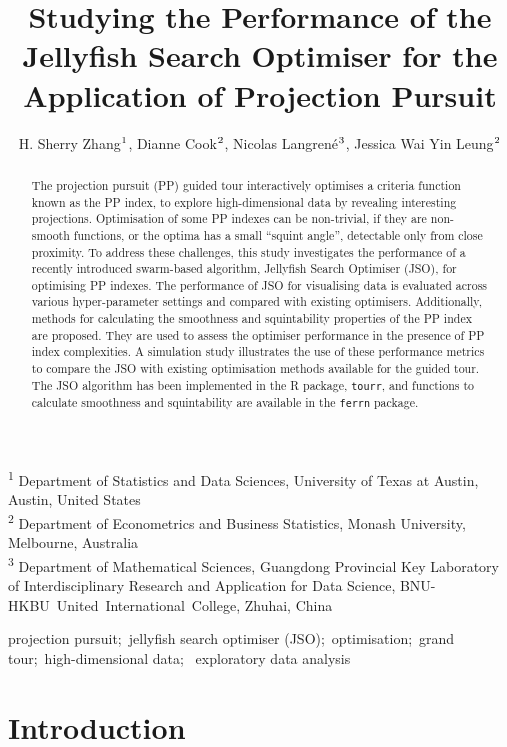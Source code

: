 \documentclass[
  12pt,
]{interact}
\title{Studying the Performance of the Jellyfish Search Optimiser for
the Application of Projection Pursuit}
\author{H. Sherry Zhang$\textsuperscript{1}$, Dianne
Cook$\textsuperscript{2}$, Nicolas
Langrené$\textsuperscript{3}$, Jessica Wai Yin
Leung$\textsuperscript{2}$}
\theoremstyle{plain}
\begin{document}
\captionsetup{labelsep=space}
\maketitle
\textsuperscript{1} Department of Statistics and Data
Sciences, University of Texas at Austin, Austin, United
States\\ \textsuperscript{2} Department of Econometrics and Business
Statistics, Monash
University, Melbourne, Australia\\ \textsuperscript{3} Department of
Mathematical Sciences, Guangdong Provincial Key Laboratory of
Interdisciplinary Research and Application for Data Science,
BNU-HKBU~United~International~College, Zhuhai, China
\begin{abstract}
The projection pursuit (PP) guided tour interactively optimises a
criteria function known as the PP index, to explore high-dimensional
data by revealing interesting projections. Optimisation of some PP
indexes can be non-trivial, if they are non-smooth functions, or the
optima has a small ``squint angle'', detectable only from close
proximity. To address these challenges, this study investigates the
performance of a recently introduced swarm-based algorithm, Jellyfish
Search Optimiser (JSO), for optimising PP indexes. The performance of
JSO for visualising data is evaluated across various hyper-parameter
settings and compared with existing optimisers. Additionally, methods
for calculating the smoothness and squintability properties of the PP
index are proposed. They are used to assess the optimiser performance in
the presence of PP index complexities. A simulation study illustrates
the use of these performance metrics to compare the JSO with existing
optimisation methods available for the guided tour. The JSO algorithm
has been implemented in the R package, \texttt{tourr}, and functions to
calculate smoothness and squintability are available in the
\texttt{ferrn} package.
\end{abstract}
\begin{keywords}
\def\sep{;\ }
projection pursuit\sep jellyfish search optimiser
(JSO)\sep optimisation\sep grand tour\sep high-dimensional data\sep 
exploratory data analysis
\end{keywords}


\section{Introduction}\label{introduction}
\end{document}
